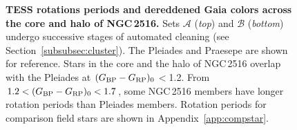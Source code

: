 \documentclass[12pt,twocolumn,tighten]{aastex63}
\newcommand{\cn}{NGC\,2516} %
\newcommand{\bpmrpo}{(G_{\rm BP}-G_{\rm RP})_0}
\begin{document}
\begin{figure}[t]
	\begin{center}
		\leavevmode

    \vspace{-0.7cm}
	\end{center}
	\vspace{-0.7cm}
  \caption{ {\bf TESS rotations periods and dereddened Gaia colors
  across the core and halo of \cn.} Sets $\mathcal{A}$ ({\it top})
  and $\mathcal{B}$ ({\it bottom}) undergo successive stages of
  automated cleaning (see Section~\ref{subsubsec:cluster}).  The Pleiades
  \citep[125\,Myr;][]{rebull_rotation_2016a} and Praesepe
  \citep[650\,Myr;][]{douglas_poking_2017} are shown for reference.
  Stars in the core and the halo of NGC\,2516 overlap with the
  Pleiades at $\bpmrpo$$<$1.2.  From $1.2<\bpmrpo<1.7$, some NGC\,2516
  members have longer rotation periods than Pleiades members. Rotation
  periods for comparison field stars are shown in
  Appendix~\ref{app:compstar}.
  \label{fig:rot}
	}
\end{figure}
\end{document}
